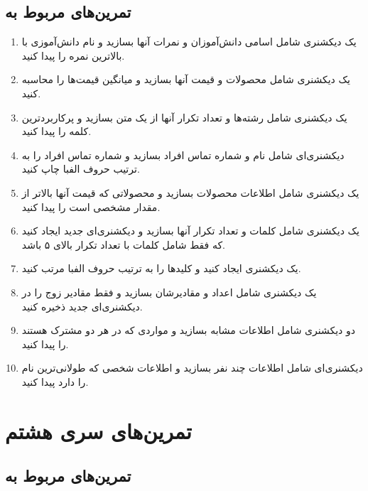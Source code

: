 \documentclass[a4paper,12pt]{article}
\begin{document}
	\subsection*{تمرین‌های مربوط به }
	
	\begin{enumerate}
		\item یک دیکشنری شامل اسامی دانش‌آموزان و نمرات آنها بسازید و نام دانش‌آموزی با بالاترین نمره را پیدا کنید.
		\item یک دیکشنری شامل محصولات و قیمت آنها بسازید و میانگین قیمت‌ها را محاسبه کنید.
		\item یک دیکشنری شامل رشته‌ها و تعداد تکرار آنها از یک متن بسازید و پرکاربردترین کلمه را پیدا کنید.
		\item دیکشنری‌ای شامل نام و شماره تماس افراد بسازید و شماره تماس افراد را به ترتیب حروف الفبا چاپ کنید.
		\item یک دیکشنری شامل اطلاعات محصولات بسازید و محصولاتی که قیمت آنها بالاتر از مقدار مشخصی است را پیدا کنید.
		\item یک دیکشنری شامل کلمات و تعداد تکرار آنها بسازید و دیکشنری‌ای جدید ایجاد کنید که فقط شامل کلمات با تعداد تکرار بالای ۵ باشد.
		\item یک دیکشنری ایجاد کنید و کلیدها را به ترتیب حروف الفبا مرتب کنید.
		\item یک دیکشنری شامل اعداد و مقادیرشان بسازید و فقط مقادیر زوج را در دیکشنری‌ای جدید ذخیره کنید.
		\item دو دیکشنری شامل اطلاعات مشابه بسازید و مواردی که در هر دو مشترک هستند را پیدا کنید.
		\item دیکشنری‌ای شامل اطلاعات چند نفر بسازید و اطلاعات شخصی که طولانی‌ترین نام را دارد پیدا کنید.
	\end{enumerate}
	
	
	
	\newpage
	\section*{تمرین‌های سری هشتم}
	
	\subsection*{تمرین‌های مربوط به }
	
\end{document}
